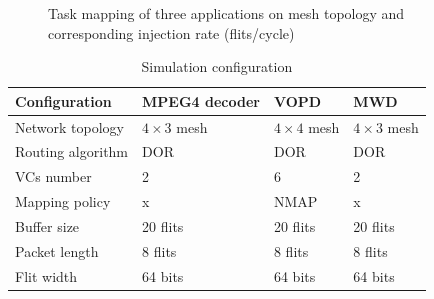 \documentclass[10pt,conference]{IEEEtran}
\begin{document}
\begin{figure}
  \caption{Task mapping of three applications on mesh topology and corresponding injection rate (flits/cycle)}
\end{figure}

\begin{table}
  \centering
  \begin{tabular}{llll}
    \hline\hline
    Configuration & MPEG4 decoder & VOPD & MWD\\
    \hline
    Network topology & $4\times 3$ mesh & $4\times 4$ mesh & $4\times 3$ mesh\\
    \hline
    Routing algorithm & DOR & DOR & DOR\\
    \hline
    VCs number & 2 & 6 & 2\\
    \hline
    Mapping policy & x & NMAP \cite{1269002} & x\\
    \hline
    Buffer size & 20 flits & 20 flits & 20 flits\\
    \hline
    Packet length & 8 flits & 8 flits & 8 flits\\
    \hline
    Flit width & 64 bits & 64 bits & 64 bits\\
    \hline
  \end{tabular}
  \caption{Simulation configuration}\label{configure}
\end{table}
\end{document}
